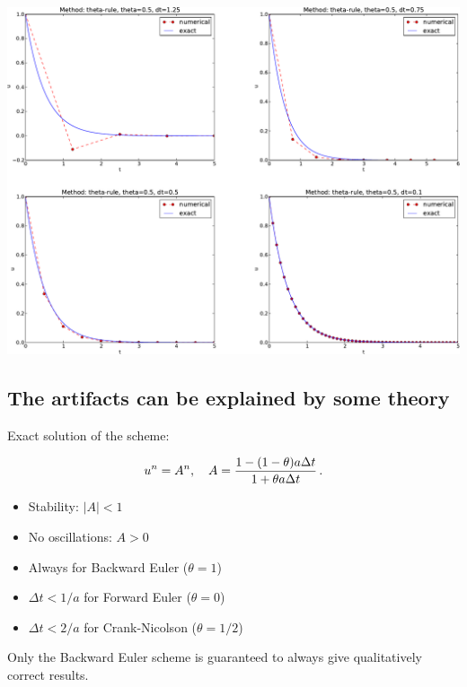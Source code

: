 \documentclass[%
oneside,                 %
final,                   %
10pt]{article}
\newenvironment{graybox1admon}[1][]{
\begin{graybox1mdframed}[frametitle=#1]
}
{
\end{graybox1mdframed}
}
\begin{document}
\begin{center}  %
  \centerline{\includegraphics[width=0.9\linewidth]{../doc/slides/fig/CN.pdf}}
\end{center}


\subsection{The artifacts can be explained by some theory}

Exact solution of the scheme:

\[ u^n = A^n,\quad A = \frac{1 - (1-\theta) a\Delta t}{1 + \theta a\Delta t}\thinspace .\]

\begin{itemize}
 \item Stability: $|A| < 1$

 \item No oscillations: $A>0$

 \item Always for Backward Euler ($\theta=1$)

 \item $\Delta t < 1/a$ for Forward Euler ($\theta=0$)

 \item $\Delta t < 2/a$ for Crank-Nicolson ($\theta=1/2$)
\end{itemize}

\noindent


\begin{graybox1admon}[Concluding remarks:]
Only the Backward Euler scheme is guaranteed to always give
qualitatively correct results.
\end{graybox1admon}




\printindex
\end{document}
